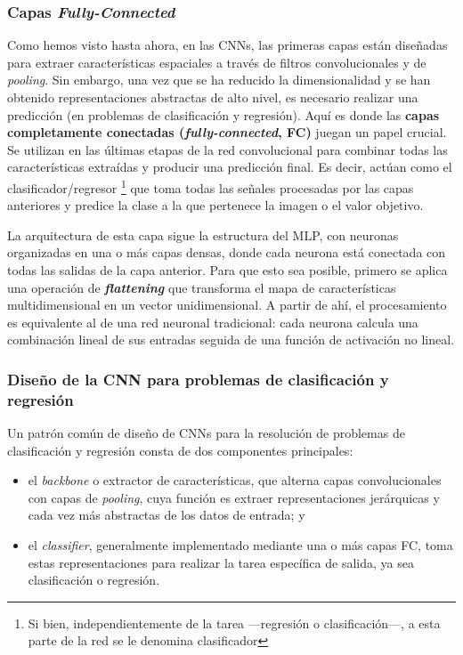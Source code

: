\subsubsection{Capas \textit{Fully-Connected}}

Como hemos visto hasta ahora, en las CNNs, las primeras capas están diseñadas para extraer características
espaciales a través de filtros convolucionales y de \textit{pooling}. Sin embargo, una vez que se ha reducido 
la dimensionalidad y se han obtenido representaciones abstractas de alto nivel, es necesario realizar una 
predicción (en problemas de clasificación y regresión). 
Aquí es donde las \textbf{capas completamente conectadas (\textit{fully-connected}, FC)} juegan un papel 
crucial. Se utilizan en las últimas etapas de la red convolucional para combinar todas las características 
extraídas y producir una predicción final. Es decir, actúan como el clasificador/regresor
\footnote{
    Si bien, independientemente de la tarea ---regresión o clasificación---, a esta parte de la red se le 
    denomina clasificador
} 
que toma todas las señales procesadas por las capas anteriores y predice la clase a la que pertenece la imagen 
o el valor objetivo. 

La arquitectura de esta capa sigue la estructura del MLP, con neuronas organizadas en una o más capas densas, 
donde cada neurona está conectada con todas las salidas de la capa anterior. Para que esto sea posible, 
primero se aplica una operación de \textbf{\textit{flattening}} que transforma el mapa de características 
multidimensional en un vector unidimensional. A partir de ahí, el procesamiento es equivalente al de una red 
neuronal tradicional: cada neurona calcula una combinación lineal de sus entradas seguida de una función de 
activación no lineal.


\subsubsection{Diseño de la CNN para problemas de clasificación y regresión}

Un patrón común de diseño de CNNs para la resolución de problemas de clasificación y regresión consta de dos
componentes principales:

\begin{itemize}

    \item el \textit{backbone} o extractor de características, que alterna capas convolucionales con capas de
    \textit{pooling}, cuya función es extraer representaciones jerárquicas y cada vez más abstractas de los 
    datos de entrada; y

    \item el \textit{classifier}, generalmente implementado mediante una o más capas FC, 
    toma estas representaciones para realizar la tarea específica de salida, ya sea clasificación o regresión.

\end{itemize}

